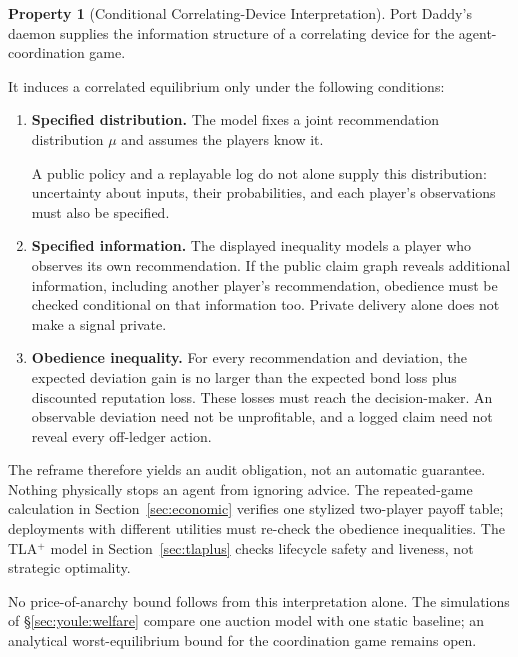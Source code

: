 \documentclass[11pt,a4paper]{article}
\theoremstyle{definition}
\newtheorem{property}{Property}[section]
\theoremstyle{remark}
\begin{document}
\begin{property}[Conditional Correlating-Device Interpretation]\label{prop:correlating-device}
\setlength{\parskip}{4pt plus 1pt}
Port Daddy's daemon supplies the information structure of a correlating device for the agent-coordination game. 

It induces a correlated equilibrium only under the following conditions:
\begin{enumerate}[nosep]
  \item \textbf{Specified distribution.} The model fixes a joint recommendation distribution $\mu$ and assumes the players know it. 

A public policy and a replayable log do not alone supply this distribution: uncertainty about inputs, their probabilities, and each player's observations must also be specified.
  \item \textbf{Specified information.} The displayed inequality models a player who observes its own recommendation. If the public claim graph reveals additional information, including another player's recommendation, obedience must be checked conditional on that information too. Private delivery alone does not make a signal private.
  \item \textbf{Obedience inequality.} For every recommendation and deviation, the expected deviation gain is no larger than the expected bond loss plus discounted reputation loss. These losses must reach the decision-maker. An observable deviation need not be unprofitable, and a logged claim need not reveal every off-ledger action.
\end{enumerate}
\end{property}

The reframe therefore yields an audit obligation, not an automatic guarantee. Nothing physically stops an agent from ignoring advice. The repeated-game calculation in Section~\ref{sec:economic} verifies one stylized two-player payoff table; deployments with different utilities must re-check the obedience inequalities. The TLA$^{+}$ model in Section~\ref{sec:tlaplus} checks lifecycle safety and liveness, not strategic optimality.

No price-of-anarchy bound follows from this interpretation alone. The simulations of \S\ref{sec:youle:welfare} compare one auction model with one static baseline; an analytical worst-equilibrium bound for the coordination game remains open.
\end{document}
